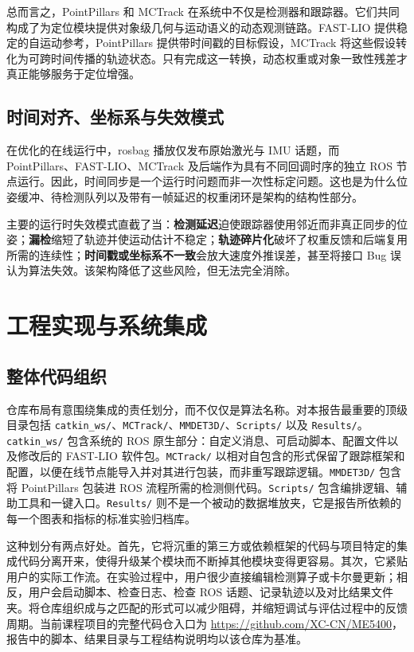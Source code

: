 \documentclass[utf8, a4paper, 12pt]{ctexart}
\begin{document}
总而言之，PointPillars 和 MCTrack 在系统中不仅是检测器和跟踪器。它们共同构成了为定位模块提供对象级几何与运动语义的动态观测链路。FAST-LIO 提供稳定的自运动参考，PointPillars 提供带时间戳的目标假设，MCTrack 将这些假设转化为可跨时间传播的轨迹状态。只有完成这一转换，动态权重或对象一致性残差才真正能够服务于定位增强。

\subsection{时间对齐、坐标系与失效模式}
在优化的在线运行中，rosbag 播放仅发布原始激光与 IMU 话题，而 PointPillars、FAST-LIO、MCTrack 及后端作为具有不同回调时序的独立 ROS 节点运行。因此，时间同步是一个运行时问题而非一次性标定问题。这也是为什么位姿缓冲、待检测队列以及带有一帧延迟的权重闭环是架构的结构性部分。

主要的运行时失效模式直截了当：\textbf{检测延迟}迫使跟踪器使用邻近而非真正同步的位姿；\textbf{漏检}缩短了轨迹并使运动估计不稳定；\textbf{轨迹碎片化}破坏了权重反馈和后端复用所需的连续性；\textbf{时间戳或坐标系不一致}会放大速度外推误差，甚至将接口 Bug 误认为算法失效。该架构降低了这些风险，但无法完全消除。

\section{工程实现与系统集成}
\subsection{整体代码组织}
仓库布局有意围绕集成的责任划分，而不仅仅是算法名称。对本报告最重要的顶级目录包括 \texttt{catkin\_ws/}、\texttt{MCTrack/}、\texttt{MMDET3D/}、\texttt{Scripts/} 以及 \texttt{Results/}。\texttt{catkin\_ws/} 包含系统的 ROS 原生部分：自定义消息、可启动脚本、配置文件以及修改后的 FAST-LIO 软件包。\texttt{MCTrack/} 以相对自包含的形式保留了跟踪框架和配置，以便在线节点能导入并对其进行包装，而非重写跟踪逻辑。\texttt{MMDET3D/} 包含将 PointPillars 包装进 ROS 流程所需的检测侧代码。\texttt{Scripts/} 包含编排逻辑、辅助工具和一键入口。\texttt{Results/} 则不是一个被动的数据堆放夹，它是报告所依赖的每一个图表和指标的标准实验归档库。

这种划分有两点好处。首先，它将沉重的第三方或依赖框架的代码与项目特定的集成代码分离开来，使得升级某个模块而不断掉其他模块变得更容易。其次，它紧贴用户的实际工作流。在实验过程中，用户很少直接编辑检测算子或卡尔曼更新；相反，用户会启动脚本、检查日志、检查 ROS 话题、记录轨迹以及对比结果文件夹。将仓库组织成与之匹配的形式可以减少阻碍，并缩短调试与评估过程中的反馈周期。当前课程项目的完整代码仓入口为 \url{https://github.com/XC-CN/ME5400}，报告中的脚本、结果目录与工程结构说明均以该仓库为基准。
\end{document}

